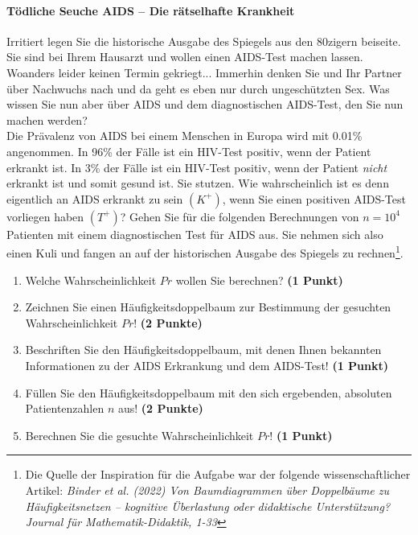 \documentclass[a4paper, 9pt]{scrartcl}\usepackage[]{graphicx}\usepackage[]{xcolor}
\begin{document}
\paragraph{T{\"o}dliche Seuche AIDS -- Die r{\"a}tselhafte Krankheit}




Irritiert legen Sie die historische Ausgabe des Spiegels aus den 80zigern
beiseite. Sie sind bei Ihrem Hausarzt und wollen einen AIDS-Test machen
lassen. Woanders leider keinen Termin gekriegt... Immerhin denken Sie und
Ihr Partner {\"u}ber Nachwuchs nach und da geht es eben nur durch
ungesch{\"u}tzten Sex. Was wissen Sie nun aber {\"u}ber AIDS und dem diagnostischen
AIDS-Test, den Sie nun machen werden?\\

Die Pr{\"a}valenz von AIDS bei einem Menschen in Europa wird mit
0.01\% angenommen. In 96\% der F{\"a}lle ist ein
HIV-Test positiv, wenn der Patient erkrankt ist. In 3\%
der F{\"a}lle ist ein HIV-Test positiv, wenn der Patient \textit{nicht}
erkrankt ist und somit gesund ist. Sie stutzen. Wie wahrscheinlich ist es
denn eigentlich an AIDS erkrankt zu sein $(K^+)$, wenn Sie einen positiven
AIDS-Test vorliegen haben $(T^+)$? Gehen Sie f{\"u}r die folgenden Berechnungen
von $n = \ensuremath{10^{4}}$ Patienten mit einem diagnostischen Test f{\"u}r AIDS
aus. Sie nehmen sich also einen Kuli und fangen an auf der historischen
Ausgabe des Spiegels zu rechnen\footnote{Die Quelle der Inspiration f{\"u}r die
  Aufgabe war der folgende wissenschaftlicher Artikel: \textit{Binder et
    al. (2022) Von Baumdiagrammen {\"u}ber Doppelb{\"a}ume zu H{\"a}ufigkeitsnetzen --
    kognitive {\"U}berlastung oder didaktische Unterst{\"u}tzung? Journal f{\"u}r
    Mathematik-Didaktik, 1-33}}.

\begin{enumerate}
\item Welche Wahrscheinlichkeit $Pr$ wollen Sie berechnen? \textbf{(1 Punkt)}
\item Zeichnen Sie einen H{\"a}ufigkeitsdoppelbaum zur Bestimmung der gesuchten
  Wahrscheinlichkeit $Pr$! \textbf{(2 Punkte)} 
\item Beschriften Sie den H{\"a}ufigkeitsdoppelbaum, mit denen Ihnen bekannten
  Informationen zu der AIDS Erkrankung und dem AIDS-Test! \textbf{(1 Punkt)}
\item F{\"u}llen Sie den H{\"a}ufigkeitsdoppelbaum mit den sich ergebenden,
  absoluten Patientenzahlen $n$ aus! \textbf{(2 Punkte)}
\item Berechnen Sie die gesuchte Wahrscheinlichkeit $Pr$! \textbf{(1 Punkt)}
\end{enumerate}
\end{document}
